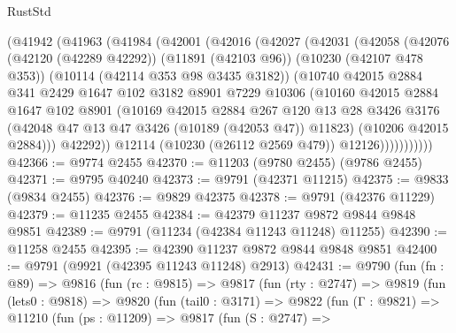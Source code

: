 \begin{lexlean}{RustStd}
\begin{coremodule}
          (@41942
            (@41963
              (@41984
                (@42001
                  (@42016
                    (@42027
                      (@42031
                        (@42058
                          (@42076
                            (@42120 (@42289 @42292))
                            (@11891 (@42103 @96))
                            (@10230 (@42107 @478 @353))
                            (@10114 (@42114 @353 @98 @3435 @3182))
                            (@10740
                              @42015
                              @2884
                              @341
                              @2429
                              @1647
                              @102
                              @3182
                              @8901
                              @7229
                              @10306
                              (@10160
                                @42015
                                @2884
                                @1647
                                @102
                                @8901
                                (@10169
                                  @42015
                                  @2884
                                  @267
                                  @120
                                  @13
                                  @28
                                  @3426
                                  @3176
                                  (@42048 @47 @13 @47 @3426 (@10189 (@42053 @47)) @11823)
                                  (@10206 @42015 @2884)))
                              @42292))
                          @12114
                          (@10230 (@26112 @2569 @479))
                          @12126)))))))))))
@42366 := @9774 @2455
@42370 := @11203 (@9780 @2455) (@9786 @2455)
@42371 := @9795 @40240
@42373 := @9791 (@42371 @11215)
@42375 := @9833 (@9834 @2455)
@42376 := @9829 @42375
@42378 := @9791 (@42376 @11229)
@42379 := @11235 @2455
@42384 := @42379 @11237 @9872 @9844 @9848 @9851
@42389 := @9791 (@11234 (@42384 @11243 @11248) @11255)
@42390 := @11258 @2455
@42395 := @42390 @11237 @9872 @9844 @9848 @9851
@42400 := @9791 (@9921 (@42395 @11243 @11248) @2913)
@42431 := @9790
    (fun (fn : @89) =>
    @9816
      (fun (rc : @9815) =>
      @9817
        (fun (rty : @2747) =>
        @9819
          (fun (lets0 : @9818) =>
          @9820
            (fun (tail0 : @3171) =>
            @9822
              (fun (Γ : @9821) =>
              @11210
                (fun (ps : @11209) =>
                @9817
                  (fun (S : @2747) =>

\end{coremodule}
\end{lexlean}
